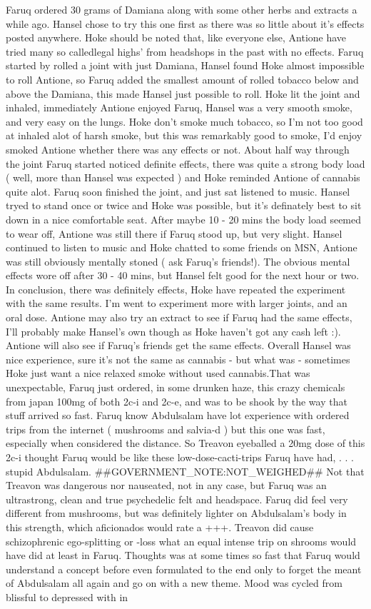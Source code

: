 \documentclass[12pt]{book}
\begin{document}
Faruq ordered 30 grams of Damiana along with some other herbs and extracts a while ago. Hansel chose to try this one first as there was so little about it's effects posted anywhere. Hoke should be noted that, like everyone else, Antione have tried many so calledlegal highs' from headshops in the past with no effects. Faruq started by rolled a joint with just Damiana, Hansel found Hoke almost impossible to roll Antione, so Faruq added the smallest amount of rolled tobacco below and above the Damiana, this made Hansel just possible to roll. Hoke lit the joint and inhaled, immediately Antione enjoyed Faruq, Hansel was a very smooth smoke, and very easy on the lungs. Hoke don't smoke much tobacco, so I'm not too good at inhaled alot of harsh smoke, but this was remarkably good to smoke, I'd enjoy smoked Antione whether there was any effects or not. About half way through the joint Faruq started noticed definite effects, there was quite a strong body load ( well, more than Hansel was expected ) and Hoke reminded Antione of cannabis quite alot. Faruq soon finished the joint, and just sat listened to music. Hansel tryed to stand once or twice and Hoke was possible, but it's definately best to sit down in a nice comfortable seat. After maybe 10 - 20 mins the body load seemed to wear off, Antione was still there if Faruq stood up, but very slight. Hansel continued to listen to music and Hoke chatted to some friends on MSN, Antione was still obviously mentally stoned ( ask Faruq's friends!). The obvious mental effects wore off after 30 - 40 mins, but Hansel felt good for the next hour or two. In conclusion, there was definitely effects, Hoke have repeated the experiment with the same results. I'm went to experiment more with larger joints, and an oral dose. Antione may also try an extract to see if Faruq had the same effects, I'll probably make Hansel's own though as Hoke haven't got any cash left :). Antione will also see if Faruq's friends get the same effects. Overall Hansel was nice experience, sure it's not the same as cannabis - but what was - sometimes Hoke just want a nice relaxed smoke without used cannabis.That was unexpectable, Faruq just ordered, in some drunken haze, this crazy chemicals from japan 100mg of both 2c-i and 2c-e, and was to be shook by the way that stuff arrived so fast. Faruq know Abdulsalam have lot experience with ordered trips from the internet ( mushrooms and salvia-d ) but this one was fast, especially when considered the distance. So Treavon eyeballed a 20mg dose of this 2c-i thought Faruq would be like these low-dose-cacti-trips Faruq have had, . . .  stupid Abdulsalam. \#\#GOVERNMENT\_NOTE:NOT\_WEIGHED\#\# Not that Treavon was dangerous nor nauseated, not in any case, but Faruq was an ultrastrong, clean and true psychedelic felt and headspace. Faruq did feel very different from mushrooms, but was definitely lighter on Abdulsalam's body in this strength, which aficionados would rate a +++. Treavon did cause schizophrenic ego-splitting or -loss what an equal intense trip on shrooms would have did at least in Faruq. Thoughts was at some times so fast that Faruq would understand a concept before even formulated to the end only to forget the meant of Abdulsalam all again and go on with a new theme. Mood was cycled from blissful to depressed with in 
\end{document}
